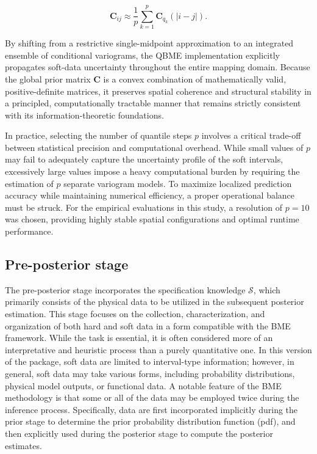 \vspace{-1em}

\begin{equation}
\boldsymbol{C}_{ij} \approx \frac{1}{p} \sum_{k=1}^{p} \boldsymbol{C}_{q_k}(|i - j|)
\label{eq:qbme-vignette-cov}.
\end{equation}

By shifting from a restrictive single-midpoint approximation to an integrated ensemble of conditional variograms, the QBME implementation explicitly propagates soft-data uncertainty throughout the entire mapping domain. Because the global prior matrix \(\boldsymbol{C}\) is a convex combination of mathematically valid, positive-definite matrices, it preserves spatial coherence and structural stability in a principled, computationally tractable manner that remains strictly consistent with its information-theoretic foundations.

In practice, selecting the number of quantile steps \(p\) involves a critical trade-off between statistical precision and computational overhead. While small values of \(p\) may fail to adequately capture the uncertainty profile of the soft intervals, excessively large values impose a heavy computational burden by requiring the estimation of \(p\) separate variogram models. To maximize localized prediction accuracy while maintaining numerical efficiency, a proper operational balance must be struck. For the empirical evaluations in this study, a resolution of \(p = 10\) was chosen, providing highly stable spatial configurations and optimal runtime performance.

\subsection{Pre-posterior stage}\label{pre-posterior-stage}

The pre-posterior stage incorporates the specification knowledge \(\mathcal{S}\), which primarily consists of the physical data to be utilized in the subsequent posterior estimation. This stage focuses on the collection, characterization, and organization of both hard and soft data in a form compatible with the BME framework. While the task is essential, it is often considered more of an interpretative and heuristic process than a purely quantitative one. In this version of the package, soft data are limited to interval-type information; however, in general, soft data may take various forms, including probability distributions, physical model outputs, or functional data. A notable feature of the BME methodology is that some or all of the data may be employed twice during the inference process. Specifically, data are first incorporated implicitly during the prior stage to determine the prior probability distribution function (pdf), and then explicitly used during the posterior stage to compute the posterior estimates.

